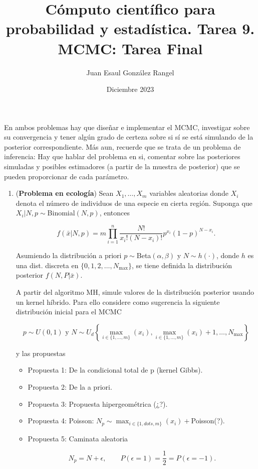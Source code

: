 \documentclass{article}
\title{Cómputo científico para probabilidad y estadística. Tarea 9.\\
MCMC: Tarea Final}
\author{Juan Esaul González Rangel}
\date{Diciembre 2023}
\begin{document}
\maketitle

En ambos problemas hay que diseñar e implementar el MCMC, investigar sobre su convergencia y tener algún grado de certeza sobre si sí se está simulando de la posterior correspondiente. Más aun, recuerde que se trata de un problema de inferencia: Hay que hablar del problema en si, comentar sobre las posteriores simuladas y posibles estimadores (a partir de la muestra de posterior) que se pueden proporcionar de cada parámetro.

\begin{enumerate}
    \item (\textbf{Problema en ecología}) Sean $X_1, \dots, X_m$ variables aleatorias donde $X_i$ denota el número de individuos de una especie en cierta región. Suponga que $X_i|N, p \sim $Binomial$(N, p)$, entonces
    
    \[f (\bar x|N, p) = m\prod_{i=1}^n \frac{N!}{x_i!(N - x_i)!}p^{x_i} (1 - p)^{N - x_i}.\]

    Asumiendo la distribución a priori $p \sim $Beta$(\alpha, \beta)$ y $N \sim h(\cdot)$, donde $h$ es una dist. discreta en $\{0, 1, 2, \dots , N_{\max} \}$, se tiene definida la distribución posterior $f (N, P |\bar x)$.
    
    A partir del algoritmo MH, simule valores de la distribución posterior usando un kernel híbrido. Para ello considere como sugerencia la siguiente distribución inicial para el MCMC 
    
    \[p \sim U(0, 1) \text{ y } N \sim U_d \left\{\max_{i\in\{1,\dots,m\}}(x_i), \max_{i\in\{1,\dots,m\}}(x_i) + 1, \dots , N_{\max}\right\}\]
    
    y las propuestas

    \begin{itemize}
        \item Propuesta 1: De la condicional total de p (kernel Gibbs).
        \item Propuesta 2: De la a priori.
        \item Propuesta 3: Propuesta hipergeométrica (¿?).
        \item Propuesta 4: Poisson: $N_p \sim \max_{i\in\{1,dots,m\}}(x_i) + $Poisson(?).
        \item Propuesta 5: Caminata aleatoria
    
    \[N_p = N + \epsilon, \qquad P(\epsilon = 1) = \frac12 = P(\epsilon = -1).\]
    

\end{itemize}
\end{enumerate}
\end{document}
